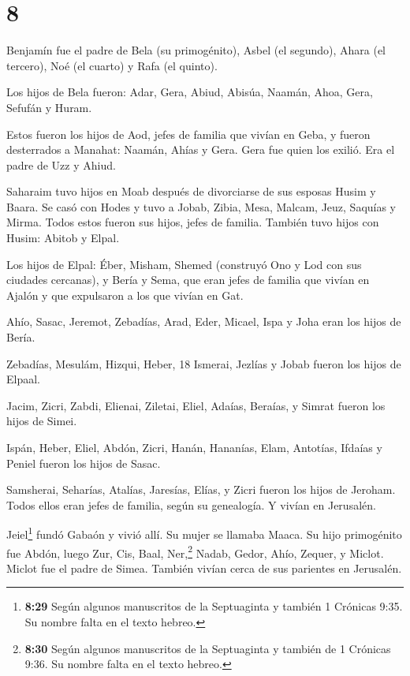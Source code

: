 \hypertarget{section-7}{%
\section{8}\label{section-7}}

 Benjamín fue el padre de Bela (su primogénito), Asbel (el
segundo), Ahara (el tercero),  Noé (el cuarto) y Rafa (el
quinto).

 Los hijos de Bela fueron: Adar, Gera, Abiud, 
Abisúa, Naamán, Ahoa,  Gera, Sefufán y Huram.

 Estos fueron los hijos de Aod, jefes de familia que vivían
en Geba, y fueron desterrados a Manahat:  Naamán, Ahías y
Gera. Gera fue quien los exilió. Era el padre de Uzz y Ahiud.

 Saharaim tuvo hijos en Moab después de divorciarse de sus
esposas Husim y Baara.  Se casó con Hodes y tuvo a Jobab,
Zibia, Mesa, Malcam,  Jeuz, Saquías y Mirma. Todos estos
fueron sus hijos, jefes de familia.  También tuvo hijos con
Husim: Abitob y Elpal.

 Los hijos de Elpal: Éber, Misham, Shemed (construyó Ono y
Lod con sus ciudades cercanas),  y Bería y Sema, que eran
jefes de familia que vivían en Ajalón y que expulsaron a los que vivían
en Gat.

 Ahío, Sasac, Jeremot,  Zebadías, Arad, Eder,
 Micael, Ispa y Joha eran los hijos de Bería.

 Zebadías, Mesulám, Hizqui, Heber, 18 Ismerai, Jezlías y
Jobab fueron los hijos de Elpaal.

 Jacim, Zicri, Zabdi,  Elienai, Ziletai,
Eliel,  Adaías, Beraías, y Simrat fueron los hijos de
Simei.

 Ispán, Heber, Eliel,  Abdón, Zicri, Hanán,
 Hananías, Elam, Antotías,  Ifdaías y Peniel
fueron los hijos de Sasac.

 Samsherai, Seharías, Atalías,  Jaresías,
Elías, y Zicri fueron los hijos de Jeroham.  Todos ellos
eran jefes de familia, según su genealogía. Y vivían en Jerusalén.

 Jeiel\footnote{\textbf{8:29} Según algunos manuscritos de
  la Septuaginta y también 1 Crónicas 9:35. Su nombre falta en el texto
  hebreo.} fundó Gabaón y vivió allí. Su mujer se llamaba Maaca.
 Su hijo primogénito fue Abdón, luego Zur, Cis, Baal,
Ner,\footnote{\textbf{8:30} Según algunos manuscritos de la Septuaginta
  y también de 1 Crónicas 9:36. Su nombre falta en el texto hebreo.}
Nadab,  Gedor, Ahío, Zequer,  y Miclot. Miclot
fue el padre de Simea. También vivían cerca de sus parientes en
Jerusalén.

